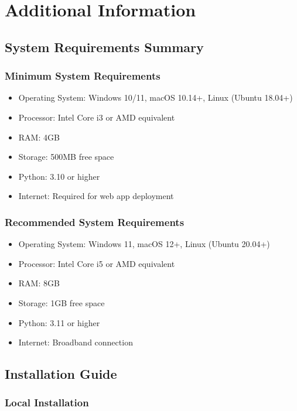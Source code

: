 \chapter{Additional Information}

\section{System Requirements Summary}

\subsection{Minimum System Requirements}
\begin{itemize}
    \item Operating System: Windows 10/11, macOS 10.14+, Linux (Ubuntu 18.04+)
    \item Processor: Intel Core i3 or AMD equivalent
    \item RAM: 4GB
    \item Storage: 500MB free space
    \item Python: 3.10 or higher
    \item Internet: Required for web app deployment
\end{itemize}

\subsection{Recommended System Requirements}
\begin{itemize}
    \item Operating System: Windows 11, macOS 12+, Linux (Ubuntu 20.04+)
    \item Processor: Intel Core i5 or AMD equivalent
    \item RAM: 8GB
    \item Storage: 1GB free space
    \item Python: 3.11 or higher
    \item Internet: Broadband connection
\end{itemize}

\section{Installation Guide}

\subsection{Local Installation}

